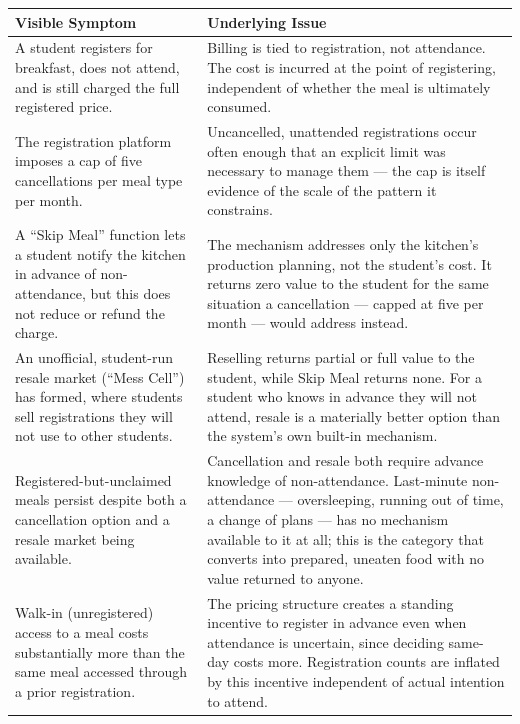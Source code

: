 \documentclass[11pt]{article}
\begin{document}
\begin{longtable}{L{0.45\textwidth}L{0.45\textwidth}}
\toprule
\textbf{Visible Symptom} & \textbf{Underlying Issue} \\
\midrule
\endhead
A student registers for breakfast, does not attend, and is still charged the full
registered price. &
Billing is tied to registration, not attendance. The cost is incurred at the point of
registering, independent of whether the meal is ultimately consumed. \\[6pt]

The registration platform imposes a cap of five cancellations per meal type per
month. &
Uncancelled, unattended registrations occur often enough that an explicit limit was
necessary to manage them --- the cap is itself evidence of the scale of the pattern it
constrains. \\[6pt]

A ``Skip Meal'' function lets a student notify the kitchen in advance of
non-attendance, but this does not reduce or refund the charge. &
The mechanism addresses only the kitchen's production planning, not the student's
cost. It returns zero value to the student for the same situation a cancellation ---
capped at five per month --- would address instead. \\[6pt]

An unofficial, student-run resale market (``Mess Cell'') has formed, where students
sell registrations they will not use to other students. &
Reselling returns partial or full value to the student, while Skip Meal returns none.
For a student who knows in advance they will not attend, resale is a materially
better option than the system's own built-in mechanism. \\[6pt]

Registered-but-unclaimed meals persist despite both a cancellation option and a
resale market being available. &
Cancellation and resale both require advance knowledge of non-attendance.
Last-minute non-attendance --- oversleeping, running out of time, a change of plans
--- has no mechanism available to it at all; this is the category that converts into
prepared, uneaten food with no value returned to anyone. \\[6pt]

Walk-in (unregistered) access to a meal costs substantially more than the same meal
accessed through a prior registration. &
The pricing structure creates a standing incentive to register in advance even when
attendance is uncertain, since deciding same-day costs more. Registration counts are
inflated by this incentive independent of actual intention to attend. \\[6pt]


\end{longtable}
\end{document}
